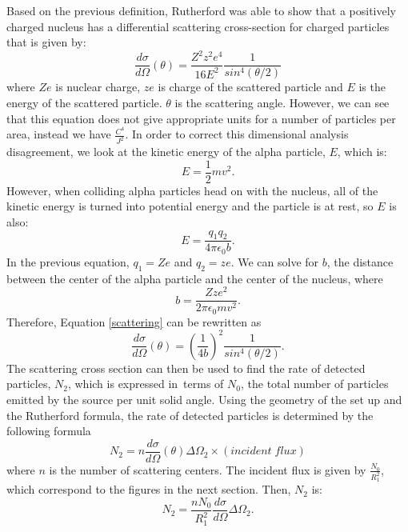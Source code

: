 Based on the previous definition, Rutherford was able to show that a positively charged nucleus has a differential scattering cross-section for charged particles that is given by:
\begin {equation}\label{scattering} \frac{d\sigma}{d\Omega}(\theta)= \frac{Z^2z^2e^4}{16E^2} \frac{1}{sin^4(\theta/2)}\end{equation} where $Ze$ is nuclear charge, $ze$ is charge of the scattered particle and $E$ is the energy of the scattered particle. $\theta$ is the scattering angle. However, we can see that this equation does not give appropriate units for a number of particles per area, instead we have $\frac{C^4}{J^2}$.
In order to correct this dimensional analysis disagreement, we look at the kinetic energy of the alpha particle, $E$, which is:
\begin{equation} E=\frac{1}{2}mv^2.\end{equation} However, when colliding alpha particles head on with the nucleus, all of the kinetic energy is turned into potential energy and the particle is at rest, so $E$ is also:
\begin{equation} E=\frac{q_1q_2}{4\pi\epsilon_0 b}.\end{equation} In the previous equation, $q_1=Ze$ and $q_2=ze$. We can solve for $b$, the distance between the center of the alpha particle and the center of the nucleus, where\begin{equation} b= \frac{Zze^2}{2\pi \epsilon_0 mv^2}.\end{equation}
Therefore, Equation \ref{scattering} can be rewritten as\begin{equation}\frac{d\sigma}{d\Omega}(\theta)=\left(\frac{1}{4b}\right)^2\frac{1}{sin^4(\theta/2)}.\end{equation}
\newline The scattering cross section can then be used to find the rate of detected particles, $N_2$, which is expressed in\ terms of $N_0$, the total number of particles emitted by the source per unit solid angle. Using the geometry of the set up and the Rutherford formula, the rate of detected particles is determined by the following formula
\begin{equation} N_2=n\frac{d\sigma}{d\Omega}(\theta)\Delta\Omega_2\times (incident\;flux)\end{equation} where $n$ is the number of scattering centers. The incident flux is given by $\frac{N_0}{R_1^2}$, which correspond to the figures in the next section. Then, $N_2$ is:
\begin{equation} N_2=\frac{nN_0}{R_1^2}\frac{d\sigma}{d\Omega}\Delta\Omega_2.\end{equation}
